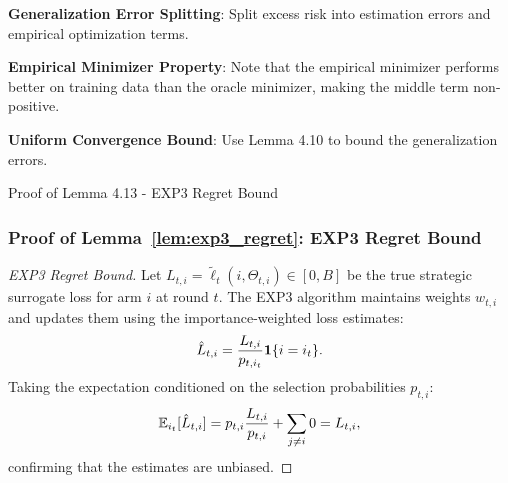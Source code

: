 \begin{guideblock}
\item \textbf{Generalization Error Splitting}: Split excess risk into estimation errors and empirical optimization terms.
\item \textbf{Empirical Minimizer Property}: Note that the empirical minimizer performs better on training data than the oracle minimizer, making the middle term non-positive.
\item \textbf{Uniform Convergence Bound}: Use Lemma 4.10 to bound the generalization errors.
\end{guideblock}


\begin{sourceblock}{Proof of Lemma 4.13 - EXP3 Regret Bound}
\subsubsection*{Proof of Lemma~\ref{lem:exp3_regret}: EXP3 Regret Bound}
\label{app:proof_exp3_regret}
\begin{proof}[EXP3 Regret Bound]
Let $L_{t,i} = \tilde{\ell}_t(i, \Theta_{t,i}) \in [0, B]$ be the true strategic surrogate loss for arm $i$ at round $t$. The EXP3 algorithm maintains weights $w_{t,i}$ and updates them using the importance-weighted loss estimates:
\begin{equation}
    \hat{L}_{t,i} = \frac{L_{t,i}}{p_{t, i_t}} \mathbf{1}\{i = i_t\}.
\end{equation}
Taking the expectation conditioned on the selection probabilities $p_{t,i}$:
\begin{equation}
    \mathbb{E}_{i_t}[\hat{L}_{t,i}] = p_{t,i} \frac{L_{t,i}}{p_{t,i}} + \sum_{j \ne i} 0 = L_{t,i},
\end{equation}
confirming that the estimates are unbiased.


\end{proof}
\end{sourceblock}
